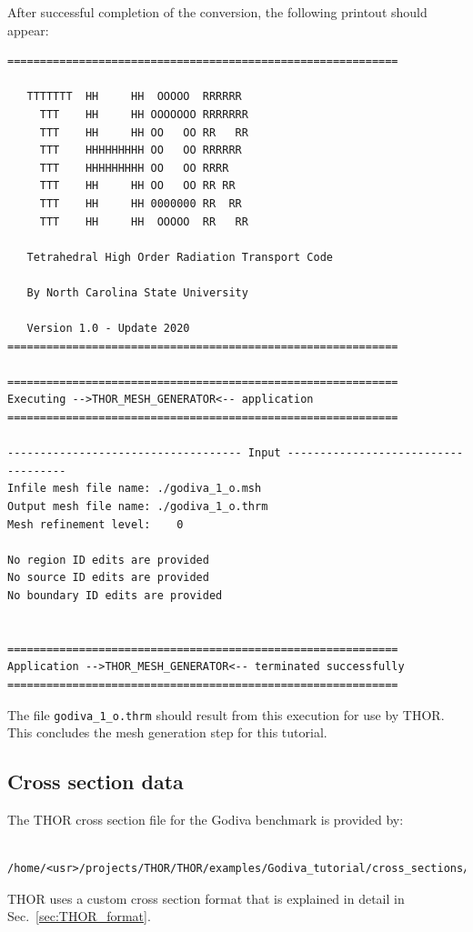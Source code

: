 After successful completion of the conversion, the following printout should appear:
\begin{verbatim}
============================================================

   TTTTTTT  HH     HH  OOOOO  RRRRRR
     TTT    HH     HH OOOOOOO RRRRRRR
     TTT    HH     HH OO   OO RR   RR
     TTT    HHHHHHHHH OO   OO RRRRRR
     TTT    HHHHHHHHH OO   OO RRRR
     TTT    HH     HH OO   OO RR RR
     TTT    HH     HH 0000000 RR  RR
     TTT    HH     HH  OOOOO  RR   RR

   Tetrahedral High Order Radiation Transport Code

   By North Carolina State University

   Version 1.0 - Update 2020
============================================================

============================================================
Executing -->THOR_MESH_GENERATOR<-- application
============================================================

------------------------------------ Input ------------------------------------
Infile mesh file name: ./godiva_1_o.msh
Output mesh file name: ./godiva_1_o.thrm
Mesh refinement level:    0

No region ID edits are provided
No source ID edits are provided
No boundary ID edits are provided


============================================================
Application -->THOR_MESH_GENERATOR<-- terminated successfully
============================================================
\end{verbatim}

The file \verb"godiva_1_o.thrm" should result from this execution for use by THOR. This concludes the mesh generation step for this tutorial.

\subsection{Cross section data}
The THOR cross section file for the Godiva benchmark is provided by:
\begin{verbatim}
    /home/<usr>/projects/THOR/THOR/examples/Godiva_tutorial/cross_sections/godiva.xs
\end{verbatim}
THOR uses a custom cross section format that is explained in detail in Sec.~\ref{sec:THOR_format}.

